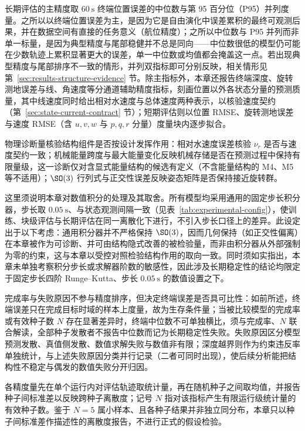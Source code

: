 长期评估的主精度取 \(60~\mathrm{s}\) 终端位置误差的中位数与第 95 百分位（P95）并列度量。之所以以终端位置误差为主，是因为它是自由演化中误差累积的最终可观测后果，并在数据空间有直接的任务意义（航位精度）；之所以中位数与 P95 并列而非单一标量，是因为典型精度与尾部稳健并不总是同向——中位数很低的模型仍可能在少数轨迹上累积显著更大的误差，单一中位数或均值都会掩盖这一点。若出现典型精度与尾部排序不一致的情形，并列双指标即可分别反映，相关情形见第~\ref{sec:results-structure-evidence} 节。除主指标外，本章还报告终端深度、旋转测地误差与线、角速度等分通道辅助精度指标，刻画位置以外各状态分量的预测质量，其中线速度同时给出相对水速度与总体速度两种表示，以核验速度契约（第~\ref{sec:state-current-contract} 节）；短期评估则以位置 RMSE、旋转测地误差与速度 RMSE（含 \(u,v,w\) 与 \(p,q,r\) 分量）度量块内逐步拟合。

物理诊断量核验结构组件是否按设计发挥作用：相对水速度误差核验 \(\nu_r\) 是否与速度契约一致；机械能量跨度与最大能量变化反映机械存储是否在预测过程中保持有限量级，这一诊断仅对含显式能量结构的候选有定义（不含能量结构的 M4、M5 等不适用）；\(\SO(3)\) 行列式与正交性误差反映姿态矩阵是否保持接近旋转群。

这里须说明本章对数值积分的处理及其取舍。所有模型均采用通用的固定步长积分器，步长取 \(0.05~\mathrm{s}\)、与状态观测间隔一致（见表~\ref{tab:experimental-config}），使训练、块级评估与长期评估在同一离散化下进行，不引入步长口径上的差异。此设定出于以下考虑：通用积分器并不严格保持 \(\SO(3)\)，因而几何保持（如正交性偏离）在本章被作为可诊断、并可由结构隐式改善的被检验量，而非由积分器从外部强制为零的约束，这与本章以受控对照检验结构作用的取向一致。同时须如实指出，本章未单独考察积分步长或求解器阶数的敏感性，因此涉及长期稳定性的结论均限定于固定步长四阶 Runge--Kutta、步长 \(0.05~\mathrm{s}\) 的数值设置之下。

完成率与失败原因不参与精度排序，但决定终端误差是否具可比性：如前所述，终端误差只在完成目标时域的样本上度量，故为生存条件量；当被比较模型的完成率或有效种子数 \(N\) 存在显著差异时，终端中位数不可单独横比，须与完成率、\(N\) 联合解读，全部种子发散者不报告中位数而记为长期稳定性失败。失败原因区分模型预测发散、真值侧发散、数值求解失败与数值非有限；深度越界则作为约束违反率单独统计，与上述失败原因分类并行记录（二者可同时出现），使后续分析能把结构性不稳定与偶发的数值失败分开归因。

各精度量先在单个运行内对评估轨迹取统计量，再在随机种子之间取均值，并报告种子间标准差以反映跨种子离散度；记号 \(N\) 指对该指标产生有限运行级统计量的有效种子数。鉴于 \(N=5\) 属小样本、且各种子结果并非独立同分布，本章只以种子间标准差作描述性的离散度报告，不进行正式的假设检验。

